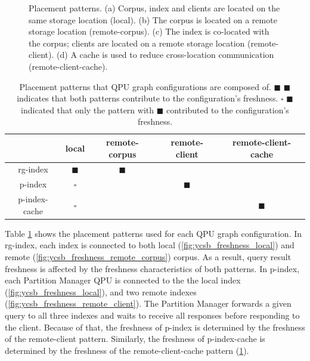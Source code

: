 \begin{figure}[H]
\begin{subfigure}{0.24\textwidth}
    \caption{}
    \label{fig:ycsb_freshness_remote_client_cache}
  \end{subfigure}%
  \caption{Placement patterns. (a) Corpus, index and clients are located on the same storage location (local).
  (b) The corpus is located on a remote storage location (remote-corpus). (c) The index is co-located with the corpus;
  clients are located on a remote storage location (remote-client). (d) A cache is used to reduce cross-location communication (remote-client-cache).}
  \label{fig:placement_patterns}
\end{figure}

\begin{table}[H]
\centering
\begin{tabular}{|c||c|c|c|c||}
\hline
& local & remote-corpus & remote-client & remote-client-cache \\
\hline
rg-index & $\blacksquare$ & $\blacksquare$ &  & \\
\hline
p-index & $\square$ & & $\blacksquare$ & \\
\hline
p-index-cache & $\square$ & &  & $\blacksquare$ \\
\hline
\end{tabular}
\caption{Placement patterns that QPU graph configurations are composed of.
$\blacksquare$ $\blacksquare$ indicates that both patterns contribute to the configuration's freshness.
$\square$ $\blacksquare$ indicated that only the pattern with $\blacksquare$ contributed to the configuration's freshness.}
\label{tab:placement_patterns}
\end{table}

Table \ref{tab:placement_patterns} shows the placement patterns used for each QPU graph configuration.
In rg-index, each index is connected to both local (\ref{fig:ycsb_freshness_local}) and remote (\ref{fig:ycsb_freshness_remote_corpus}) corpus.
As a result, query result freshness is affected by the freshness characteristics of both patterns.
In p-index, each Partition Manager QPU is connected to the the local index (\ref{fig:ycsb_freshness_local}),
and two remote indexes (\ref{fig:ycsb_freshness_remote_client}).
The Partition Manager forwards a given query to all three indexes and waits to receive all responses before responding to
the client.
Because of that, the freshness of p-index is determined by the freshness of the remote-client pattern.
Similarly, the freshness of p-index-cache is determined by the freshness of the remote-client-cache pattern
(\ref{fig:ycsb_freshness_remote_client_cache}).



